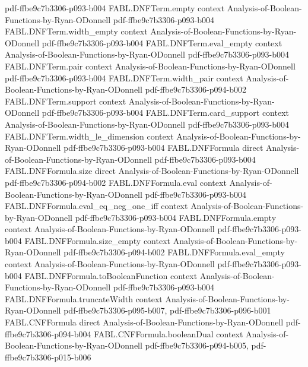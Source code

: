 \begin{theorem}
  {pdf-ffbe9c7b3306-p093-b004}
\proofstep
  {FABL.DNFTerm.empty}
  {context}
  {Analysis-of-Boolean-Functions-by-Ryan-ODonnell}
  {pdf-ffbe9c7b3306-p093-b004}
\proofstep
  {FABL.DNFTerm.width_empty}
  {context}
  {Analysis-of-Boolean-Functions-by-Ryan-ODonnell}
  {pdf-ffbe9c7b3306-p093-b004}
\proofstep
  {FABL.DNFTerm.eval_empty}
  {context}
  {Analysis-of-Boolean-Functions-by-Ryan-ODonnell}
  {pdf-ffbe9c7b3306-p093-b004}
\proofstep
  {FABL.DNFTerm.pair}
  {context}
  {Analysis-of-Boolean-Functions-by-Ryan-ODonnell}
  {pdf-ffbe9c7b3306-p093-b004}
\proofstep
  {FABL.DNFTerm.width_pair}
  {context}
  {Analysis-of-Boolean-Functions-by-Ryan-ODonnell}
  {pdf-ffbe9c7b3306-p094-b002}
\proofstep
  {FABL.DNFTerm.support}
  {context}
  {Analysis-of-Boolean-Functions-by-Ryan-ODonnell}
  {pdf-ffbe9c7b3306-p093-b004}
\proofstep
  {FABL.DNFTerm.card_support}
  {context}
  {Analysis-of-Boolean-Functions-by-Ryan-ODonnell}
  {pdf-ffbe9c7b3306-p093-b004}
\proofstep
  {FABL.DNFTerm.width_le_dimension}
  {context}
  {Analysis-of-Boolean-Functions-by-Ryan-ODonnell}
  {pdf-ffbe9c7b3306-p093-b004}
\proofstep
  {FABL.DNFFormula}
  {direct}
  {Analysis-of-Boolean-Functions-by-Ryan-ODonnell}
  {pdf-ffbe9c7b3306-p093-b004}
\proofstep
  {FABL.DNFFormula.size}
  {direct}
  {Analysis-of-Boolean-Functions-by-Ryan-ODonnell}
  {pdf-ffbe9c7b3306-p094-b002}
\proofstep
  {FABL.DNFFormula.eval}
  {context}
  {Analysis-of-Boolean-Functions-by-Ryan-ODonnell}
  {pdf-ffbe9c7b3306-p093-b004}
\proofstep
  {FABL.DNFFormula.eval_eq_neg_one_iff}
  {context}
  {Analysis-of-Boolean-Functions-by-Ryan-ODonnell}
  {pdf-ffbe9c7b3306-p093-b004}
\proofstep
  {FABL.DNFFormula.empty}
  {context}
  {Analysis-of-Boolean-Functions-by-Ryan-ODonnell}
  {pdf-ffbe9c7b3306-p093-b004}
\proofstep
  {FABL.DNFFormula.size_empty}
  {context}
  {Analysis-of-Boolean-Functions-by-Ryan-ODonnell}
  {pdf-ffbe9c7b3306-p094-b002}
\proofstep
  {FABL.DNFFormula.eval_empty}
  {context}
  {Analysis-of-Boolean-Functions-by-Ryan-ODonnell}
  {pdf-ffbe9c7b3306-p093-b004}
\proofstep
  {FABL.DNFFormula.toBooleanFunction}
  {context}
  {Analysis-of-Boolean-Functions-by-Ryan-ODonnell}
  {pdf-ffbe9c7b3306-p093-b004}
\proofstep
  {FABL.DNFFormula.truncateWidth}
  {context}
  {Analysis-of-Boolean-Functions-by-Ryan-ODonnell}
  {pdf-ffbe9c7b3306-p095-b007,
    pdf-ffbe9c7b3306-p096-b001}
\proofstep
  {FABL.CNFFormula}
  {direct}
  {Analysis-of-Boolean-Functions-by-Ryan-ODonnell}
  {pdf-ffbe9c7b3306-p094-b004}
\proofstep
  {FABL.CNFFormula.booleanDual}
  {context}
  {Analysis-of-Boolean-Functions-by-Ryan-ODonnell}
  {pdf-ffbe9c7b3306-p094-b005,
    pdf-ffbe9c7b3306-p015-b006}

\end{theorem}
